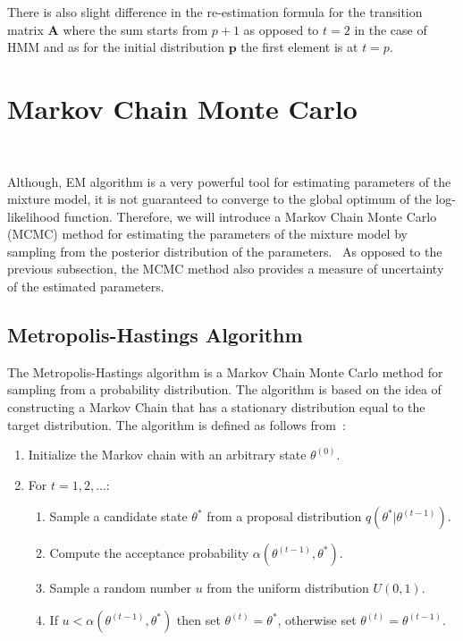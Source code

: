 There is also slight difference in the re-estimation formula for the transition matrix $\textbf{A}$ where the sum starts from $p+1$ as opposed to $t=2$ in the case of HMM and 
as for the initial distribution $\textbf{p}$ the first element is at $t=p$.~\citep{Xuan2004}

\section{Markov Chain Monte Carlo}~\label{sec:mcmc}

Although, EM algorithm is a very powerful tool for estimating parameters of the mixture model,
it is not guaranteed to converge to the global optimum of the log-likelihood function. Therefore, 
we will introduce a Markov Chain Monte Carlo (MCMC) method for estimating the parameters of the mixture model by 
sampling from the posterior distribution of the parameters.~\citep{Speagle2020} 
As opposed to the previous subsection, the MCMC method also provides a measure of uncertainty of the estimated parameters.~\citep{Spade2020}     

\subsection{Metropolis-Hastings Algorithm}

The Metropolis-Hastings algorithm is a Markov Chain Monte Carlo method for sampling from a probability distribution. 
The algorithm is based on the idea of constructing a Markov Chain that has a stationary distribution equal to the target distribution.
The algorithm is defined as follows from~\citep{Robert2004}:

\begin{enumerate}
    \item Initialize the Markov chain with an arbitrary state $\theta^{(0)}$.
    \item For $t = 1,2,\dots$:
    \begin{enumerate}
        \item Sample a candidate state $\theta^*$ from a proposal distribution $q(\theta^*|\theta^{(t-1)})$.
        \item Compute the acceptance probability $\alpha(\theta^{(t-1)},\theta^*)$.
        \item Sample a random number $u$ from the uniform distribution $U(0,1)$.
        \item If $u < \alpha(\theta^{(t-1)},\theta^*)$ then set $\theta^{(t)} = \theta^*$, otherwise set $\theta^{(t)} = \theta^{(t-1)}$.
    \end{enumerate}
\end{enumerate}


